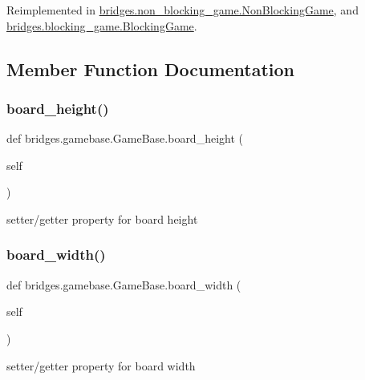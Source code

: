Reimplemented in \mbox{\hyperlink{classbridges_1_1non__blocking__game_1_1_non_blocking_game_a19362773d256eec033f04cfd00b7160c}{bridges.\+non\+\_\+blocking\+\_\+game.\+Non\+Blocking\+Game}}, and \mbox{\hyperlink{classbridges_1_1blocking__game_1_1_blocking_game_ae2575c068499e269e2279695d5f598b4}{bridges.\+blocking\+\_\+game.\+Blocking\+Game}}.



\subsection{Member Function Documentation}
\mbox{\label{classbridges_1_1gamebase_1_1_game_base_ad1595582d3b02aa4225efed3beab935f}} 
\subsubsection{\texorpdfstring{board\_height()}{board\_height()}}
{\footnotesize\ttfamily def bridges.\+gamebase.\+Game\+Base.\+board\+\_\+height (\begin{DoxyParamCaption}\item[{}]{self }\end{DoxyParamCaption})}



setter/getter property for board height 

\mbox{\label{classbridges_1_1gamebase_1_1_game_base_a46a635c075e1a0a651e4caa18369494d}} 
\subsubsection{\texorpdfstring{board\_width()}{board\_width()}}
{\footnotesize\ttfamily def bridges.\+gamebase.\+Game\+Base.\+board\+\_\+width (\begin{DoxyParamCaption}\item[{}]{self }\end{DoxyParamCaption})}



setter/getter property for board width 

